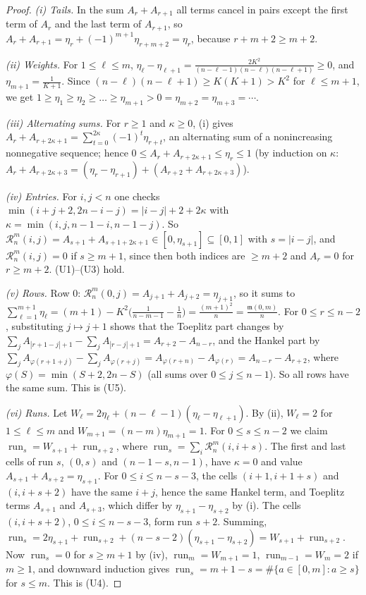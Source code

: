 \documentclass[11pt]{amsart}
\theoremstyle{definition}
\theoremstyle{remark}
\numberwithin{equation}{section}
\newcommand{\run}{\operatorname{run}}
\newcommand{\cR}{\mathcal{R}}
\newcommand{\ms}{\mathfrak{m}}
\begin{document}
\begin{proof}
\emph{(i) Tails.} In the sum $A_r+A_{r+1}$ all terms cancel in pairs except the first term of $A_r$
and the last term of $A_{r+1}$, so $A_r+A_{r+1}=\eta_r+(-1)^{m+1}\eta_{r+m+2}=\eta_r$, because
$r+m+2\ge m+2$.

\emph{(ii) Weights.} For $1\le\ell\le m$,
$\eta_\ell-\eta_{\ell+1}=\frac{2K^2}{(n-\ell-1)(n-\ell)(n-\ell+1)}\ge0$, and $\eta_{m+1}=\frac1{K+1}$. Since
$(n-\ell)(n-\ell+1)\ge K(K+1)>K^2$ for $\ell\le m+1$, we get
$1\ge\eta_1\ge\eta_2\ge\dots\ge\eta_{m+1}>0=\eta_{m+2}=\eta_{m+3}=\cdots$.

\emph{(iii) Alternating sums.} For $r\ge1$ and $\kappa\ge0$, (i) gives
$A_r+A_{r+2\kappa+1}=\sum_{t=0}^{2\kappa}(-1)^t\eta_{r+t}$, an alternating sum of a nonincreasing
nonnegative sequence; hence $0\le A_r+A_{r+2\kappa+1}\le\eta_r\le1$ (by induction on $\kappa$:
$A_r+A_{r+2\kappa+3}=(\eta_r-\eta_{r+1})+(A_{r+2}+A_{r+2\kappa+3})$).

\emph{(iv) Entries.} For $i,j<n$ one checks $\min(i+j+2,2n-i-j)=|i-j|+2+2\kappa$ with
$\kappa=\min(i,j,n-1-i,n-1-j)$. So $\cR^m_n(i,j)=A_{s+1}+A_{s+1+2\kappa+1}\in[0,\eta_{s+1}]\subseteq[0,1]$
with $s=|i-j|$, and $\cR^m_n(i,j)=0$ if $s\ge m+1$, since then both indices are $\ge m+2$ and
$A_r=0$ for $r\ge m+2$. (U1)--(U3) hold.

\emph{(v) Rows.} Row $0$: $\cR^m_n(0,j)=A_{j+1}+A_{j+2}=\eta_{j+1}$, so it sums to
$\sum_{\ell=1}^{m+1}\eta_\ell=(m+1)-K^2\bigl(\frac1{n-m-1}-\frac1n\bigr)=\frac{(m+1)^2}{n}=\frac{\ms(0,m)}n$.
For $0\le r\le n-2$, substituting $j\mapsto j+1$ shows that the Toeplitz part changes by
$\sum_jA_{|r+1-j|+1}-\sum_jA_{|r-j|+1}=A_{r+2}-A_{n-r}$, and the Hankel part by
$\sum_jA_{\varphi(r+1+j)}-\sum_jA_{\varphi(r+j)}=A_{\varphi(r+n)}-A_{\varphi(r)}=A_{n-r}-A_{r+2}$,
where $\varphi(S)=\min(S+2,2n-S)$ (all sums over $0\le j\le n-1$). So all rows have the same sum. This is (U5).

\emph{(vi) Runs.} Let $W_\ell=2\eta_\ell+(n-\ell-1)(\eta_\ell-\eta_{\ell+1})$. By (ii), $W_\ell=2$ for
$1\le\ell\le m$ and $W_{m+1}=(n-m)\eta_{m+1}=1$. For $0\le s\le n-2$ we claim
$\run_s=W_{s+1}+\run_{s+2}$, where $\run_s=\sum_i\cR^m_n(i,i+s)$. The first and last cells of run $s$,
$(0,s)$ and $(n-1-s,n-1)$, have $\kappa=0$ and value $A_{s+1}+A_{s+2}=\eta_{s+1}$. For
$0\le i\le n-s-3$, the cells $(i+1,i+1+s)$ and $(i,i+s+2)$ have the same $i+j$, hence the same Hankel
term, and Toeplitz terms $A_{s+1}$ and $A_{s+3}$, which differ by $\eta_{s+1}-\eta_{s+2}$ by (i). The
cells $(i,i+s+2)$, $0\le i\le n-s-3$, form run $s+2$. Summing,
$\run_s=2\eta_{s+1}+\run_{s+2}+(n-s-2)(\eta_{s+1}-\eta_{s+2})=W_{s+1}+\run_{s+2}$. Now $\run_s=0$ for
$s\ge m+1$ by (iv), $\run_m=W_{m+1}=1$, $\run_{m-1}=W_m=2$ if $m\ge1$, and downward induction gives
$\run_s=m+1-s=\#\{a\in[0,m]:a\ge s\}$ for $s\le m$. This is (U4).
\end{proof}
\end{document}

